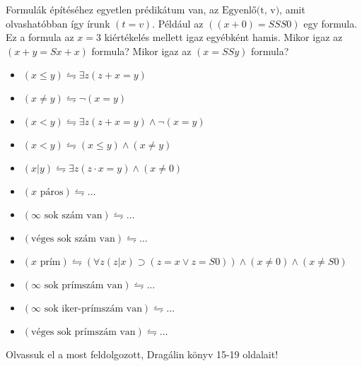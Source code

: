 \documentclass{article}
\begin{document}
Formulák építéséhez egyetlen prédikátum van, az $\text{Egyenlő(t, v)}$, amit olvashatóbban így írunk $(t=v)$.
Például az $((x+0) = SSS0)$ egy formula. Ez a formula az $x=3$ kiértékelés mellett igaz egyébként hamis.
Mikor igaz az $(x+y = Sx+x)$ formula? Mikor igaz az $(x = SSy)$ formula?

\begin{itemize}
\item
$ (x \le y) \leftrightharpoons \exists z(z+x=y)$ 

\item
$ (x \neq y) \leftrightharpoons  \neg (x=y)$ 

\item
$ (x < y) \leftrightharpoons \exists z(z+x=y) \wedge \neg (x=y)$ 

\item
$ (x < y) \leftrightharpoons  (x \le y )\wedge ( x \neq y)$ 

\item
$(x \vert y) \leftrightharpoons \exists z ( z \cdot x=y )\wedge ( x \neq 0)$ 

\item
$ (x \text{ páros}) \leftrightharpoons \dots$ 

\item
$ (\infty \text{ sok szám van}) \leftrightharpoons \dots$ 

\item
$ (\text{véges sok szám van}) \leftrightharpoons \dots$ 

\item
$ (x \text{ prím}) \leftrightharpoons  (\forall z( z \vert x )\supset ( z = x \vee z=S0))\wedge ( x \neq 0)\wedge ( x \neq S0)$ 

\item
$ (\infty \text{ sok prímszám van}) \leftrightharpoons  \dots $ 

\item
$ (\infty \text{ sok iker-prímszám van}) \leftrightharpoons  \dots $ 

\item
$ (\text{véges sok prímszám van}) \leftrightharpoons  \dots $ 


 \end{itemize}

Olvassuk el a most feldolgozott, Dragálin könyv 15-19 oldalait!
\end{document}
